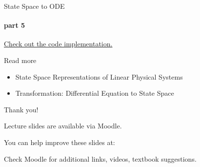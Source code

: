 \documentclass{beamer}
\begin{document}
\begin{frame}{State Space to ODE}
\framesubtitle{part 5}
\begin{flushleft}

\textcolor{blue}{\href{https://github.com/SergeiSa/Control-Theory-Slides-Spring-2022/blob/main/ColabNotebooks/StateSpace2ODE.ipynb}{Check out the code implementation.}}

\bigskip


\centerline{\textcolor{black}{}}


\end{flushleft}
\end{frame}




\begin{frame}{Read more}

\begin{itemize}
\item State Space Representations of Linear Physical Systems 

\item Transformation: Differential Equation to State Space 
\end{itemize}

\end{frame}



\begin{frame}{Thank you!}
\centerline{Lecture slides are available via Moodle.}
\bigskip
\centerline{You can help improve these slides at:}
\centerline{\mygit}
\bigskip
\centerline{Check Moodle for additional links, videos, textbook suggestions.}
\bigskip

\centerline{\textcolor{black}{}}

\end{frame}
\end{document}
